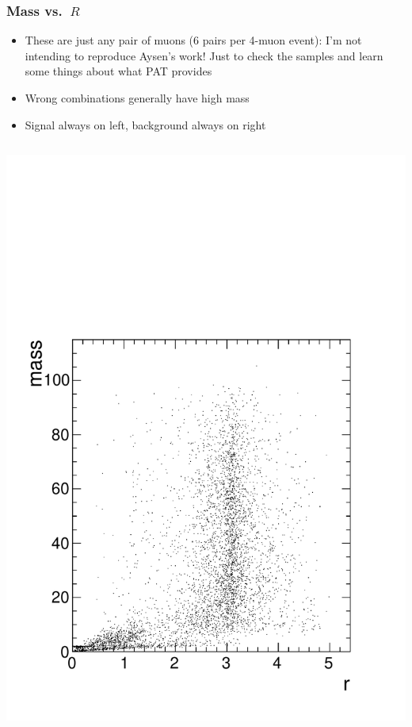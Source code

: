 \documentclass[compress]{beamer}
\begin{document}
\begin{frame}
\frametitle{Mass vs.\ $R$}

\begin{itemize}
\item These are just any pair of muons (6 pairs per 4-muon event): I'm not intending to reproduce Aysen's work!  Just to check the samples and learn some things about what PAT provides
\item Wrong combinations generally have high mass
\item Signal always on left, background always on right
\end{itemize}

\begin{columns}
\includegraphics[width=\linewidth]{mass_vs_r.pdf}

\end{columns}
\end{frame}
\end{document}
